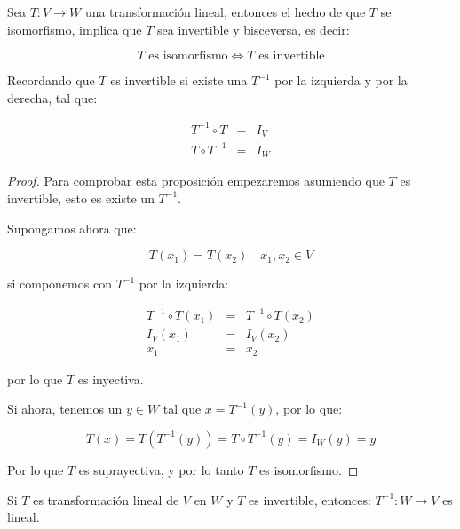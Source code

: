 		\begin{proposicion}
			Sea $T \colon V \to W$ una transformación lineal, entonces el hecho de que $T$ se isomorfismo, implica que $T$ sea invertible y bisceversa, es decir:

			\begin{equation}
				T \text{ es isomorfismo} \iff T \text{ es invertible}
			\end{equation}

			Recordando que $T$ es invertible si existe una $T^{-1}$ por la izquierda y por la derecha, tal que:

			\begin{eqnarray}
				T^{-1} \circ T & = & I_V \nonumber \\
				T \circ T^{-1} & = & I_W
			\end{eqnarray}
		\end{proposicion}

		\begin{proof}
			Para comprobar esta proposición empezaremos asumiendo que $T$ es invertible, esto es existe un $T^{-1}$.

			Supongamos ahora que:

			\begin{equation}
				T(x_1) = T(x_2) \quad x_1, x_2 \in V
			\end{equation}

			si componemos con $T^{-1}$ por la izquierda:

			\begin{eqnarray*}
				T^{-1} \circ T(x_1) & = & T^{-1} \circ T(x_2) \\
				I_V(x_1) & = & I_V(x_2) \\
				x_1 & = & x_2
			\end{eqnarray*}

			por lo que $T$ es inyectiva.

			Si ahora, tenemos un $y \in W$ tal que $x = T^{-1}(y)$, por lo que:

			\begin{equation*}
				T(x) = T(T^{-1}(y)) = T \circ T^{-1}(y) = I_W(y) = y
			\end{equation*}

			Por lo que $T$ es suprayectiva, y por lo tanto $T$ es isomorfismo.
		\end{proof}

		\begin{proposicion}
			Si $T$ es transformación lineal de $V$ en $W$ y $T$ es invertible, entonces: $T^{-1} \colon W \to V$ es lineal.
		\end{proposicion}

